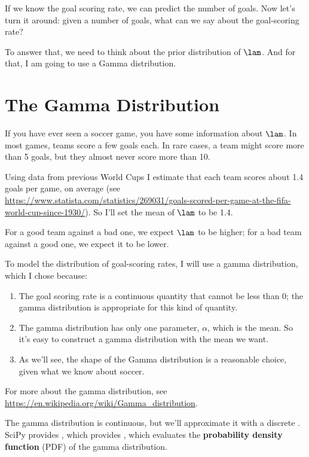 \documentclass[12pt]{book}
\theoremstyle{exercise}
\begin{document}
If we know the goal scoring rate, we can predict the number of goals.
Now let's turn it around: given a number of goals, what can we say about the goal-scoring rate?

To answer that, we need to think about the prior distribution of $\lam$. 
And for that, I am going to use a Gamma distribution.


\section{The Gamma Distribution}

If you have ever seen a soccer game, you have some information about $\lam$.  
In most games, teams score a few goals each.  
In rare cases, a team might score more than 5 goals, but they almost never score more than 10.

Using data from previous World Cups 
I estimate that each team scores about 1.4 goals per game, on average (see \url{https://www.statista.com/statistics/269031/goals-scored-per-game-at-the-fifa-world-cup-since-1930/}).  So I'll set the mean of $\lam$ to be 1.4.

For a good team against a bad one, we expect $\lam$ to be higher; for a bad team against a good one, we expect it to be lower.

To model the distribution of goal-scoring rates, I will use a gamma distribution, which I chose because:

\begin{enumerate}

\item The goal scoring rate is a continuous quantity that cannot be less than 0; the gamma distribution is appropriate for this kind of quantity.

\item The gamma distribution has only one parameter, $\alpha$, which is the mean.  So it's easy to construct a gamma distribution with the mean we want.

\item As we'll see, the shape of the Gamma distribution is a reasonable choice, given what we know about soccer.

\end{enumerate}

For more about the gamma distribution, see \url{https://en.wikipedia.org/wiki/Gamma_distribution}.

The gamma distribution is continuous, but we'll approximate it with a discrete .
SciPy provides , which provides , which evaluates the {\bf probability density function} (PDF) of the gamma distribution.
\end{document}
